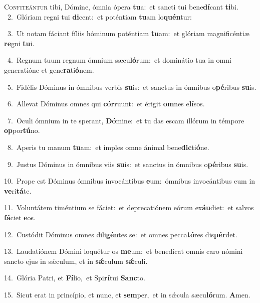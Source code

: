 \lettrine{\initial\textcolor{\initialcolor}{C}}{onfiteántur} tibi, Dómine, ómnia ópera \textbf{tu}\-a:~\star et sancti tui bene\-\textbf{dí}\-cant \textbf{ti}\-bi.\\
{\numbfont\textcolor{\numbcolor}{~2.}}~Glóriam regni tui \textbf{di}\-cent:~\star et poténtiam \textbf{tu}\-am lo\-\textbf{quén}\-tur:\par
{\numbfont\textcolor{\numbcolor}{~3.}}~Ut notam fáciant fíliis hóminum poténtiam \textbf{tu}\-am:~\star et glóriam magnificéntiæ \textbf{re}\-gni \textbf{tu}\-i.\par
{\numbfont\textcolor{\numbcolor}{~4.}}~Regnum tuum regnum ómnium sæcu\-\textbf{ló}\-rum:~\star et dominátio tua in omni generatióne et gene\-\textbf{ra}\-ti\-\textbf{ó}\-nem.\par
{\numbfont\textcolor{\numbcolor}{~5.}}~Fidélis Dóminus in ómnibus verbis \textbf{su}\-is:~\star et sanctus in ómnibus o\-\textbf{pé}\-ribus \textbf{su}\-is.\par
{\numbfont\textcolor{\numbcolor}{~6.}}~Allevat Dóminus omnes qui \textbf{cór}\-ruunt:~\star et érigit \textbf{om}\-nes e\-\textbf{lí}\-sos.\par
{\numbfont\textcolor{\numbcolor}{~7.}}~Oculi ómnium in te sperant, \textbf{Dó}\-mine:~\star et tu das escam illórum in témpore \textbf{op}\-por\-\textbf{tú}\-no.\par
{\numbfont\textcolor{\numbcolor}{~8.}}~Aperis tu manum \textbf{tu}\-am:~\star et imples omne ánimal bene\-\textbf{dic}\-ti\-\textbf{ó}\-ne.\par
{\numbfont\textcolor{\numbcolor}{~9.}}~Justus Dóminus in ómnibus viis \textbf{su}\-is:~\star et sanctus in ómnibus o\-\textbf{pé}\-ribus \textbf{su}\-is.\par
{\numbfont\textcolor{\numbcolor}{10.}}~Prope est Dóminus ómnibus invocántibus \textbf{e}\-um:~\star ómnibus invocántibus eum in \textbf{ve}\-ri\-\textbf{tá}\-te.\par
{\numbfont\textcolor{\numbcolor}{11.}}~Voluntátem timéntium se fáciet:~\dagger et deprecatiónem eórum ex\-\textbf{áu}\-diet:~\star et salvos \textbf{fá}\-ciet \textbf{e}\-os.\par
{\numbfont\textcolor{\numbcolor}{12.}}~Custódit Dóminus omnes dili\-\textbf{gén}\-tes se:~\star et omnes pecca\-\textbf{tó}\-res dis\-\textbf{pér}\-det.\par
{\numbfont\textcolor{\numbcolor}{13.}}~Laudatiónem Dómini loquétur os \textbf{me}\-um:~\star et benedícat omnis caro nómini sancto ejus in sǽculum, et in \textbf{sǽ}\-culum \textbf{sǽ}\-culi.\par
{\numbfont\textcolor{\numbcolor}{14.}}~Glória Patri, et \textbf{Fí}\-lio,~\star et Spi\-\textbf{rí}\-tui \textbf{Sanc}\-to.\par
{\numbfont\textcolor{\numbcolor}{15.}}~Sicut erat in princípio, et nunc, et \textbf{sem}\-per,~\star et in sǽcula sæcu\-\textbf{ló}\-rum. \textbf{A}\-men.\par
